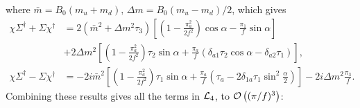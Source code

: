 where $\bar m  = B_0(m_u + m_d), \, \Delta m = B_0 (m_u - m_d)/2$, which gives 
\begin{align*}
    \chi \Sigma^\dagger + \Sigma \chi^\dagger
    & = 2(\bar m^2 + \Delta m^2 \tau_3)
        \left[
            \left(
                1 
                - \frac{\pi_a^2}{2f^2}
            \right)
            \cos{\alpha}
            - \frac{\pi_1}{f}    
            \sin{\alpha}
        \right]
    \\
    &
    + 2\Delta m^2
    \left[
        \left(
            1 
            - \frac{\pi_a^2}{2f^2}
        \right)
        \tau_2 \sin{\alpha}
        +  \frac{\pi_a}{f}
        \left(
            \delta_{a1} \tau_2 \cos{\alpha} - \delta_{a2} \tau_1
        \right)
    \right], \\
    \chi \Sigma^\dagger  - \Sigma \chi^\dagger
    & = -2i \bar m^2
        \left[
            \left(
                1 - \frac{\pi_a^2}{2f^2}
            \right)
            \tau_1 \sin{\alpha}
            +  \frac{\pi_a}{f}    \left(
                \tau_a 
                - 2 \delta_{1a} \tau_1 \sin^2{\frac{\alpha}{2}}
            \right)        
        \right]
        -2i \Delta m^2 \frac{\pi_3}{f}.
\end{align*}
Combining these results gives all the terms in $\Ell_4$, to $\Oh[3]{(\pi/f)}$:
\begingroup
\allowdisplaybreaks %
